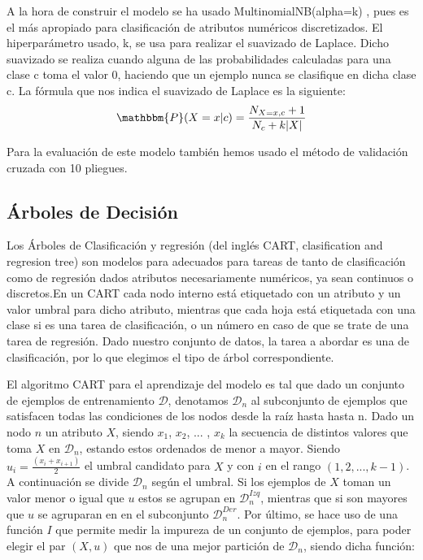 \documentclass[conference,a4paper]{IEEEtran}
\begin{document}
A la hora de construir el modelo se ha usado MultinomialNB(alpha=k)  \cite{b4}, pues es el más apropiado para clasificación de atributos numéricos discretizados. El hiperparámetro usado, k, se usa para realizar el suavizado de Laplace. Dicho suavizado se realiza cuando alguna de las probabilidades calculadas para una clase c toma el valor 0, haciendo que un ejemplo nunca se clasifique en dicha clase c. La fórmula que nos indica el suavizado de Laplace es la siguiente:
\begin{equation}
\mathbbm{P}(X = x | c) = \frac{N_{X=x,c}+1}{N_{c} + k|X|}
\end{equation}

Para la evaluación de este modelo también hemos usado el método de validación cruzada con 10 pliegues.

\subsection{Árboles de Decisión}

Los Árboles de Clasificación y regresión (del inglés CART, clasification and regresion tree) son modelos para adecuados para tareas de tanto de clasificación como de regresión dados atributos necesariamente numéricos, ya sean continuos o discretos.En un CART cada nodo interno está etiquetado con un atributo y un valor umbral para dicho atributo, mientras que cada hoja está etiquetada con una clase si es una tarea de clasificación, o un número en caso de que se trate de una tarea de regresión.  Dado nuestro conjunto de datos, la tarea a abordar es una de clasificación, por lo que elegimos el tipo de árbol correspondiente.

El algoritmo CART para el aprendizaje del modelo es tal que dado un conjunto de ejemplos de entrenamiento $\mathscr{D}$, denotamos  $\mathscr{D}_n$ al subconjunto de ejemplos que satisfacen  todas las condiciones de los nodos desde la raíz hasta hasta n. Dado un nodo $n$ un atributo $X$, siendo $x_1$, $x_2$, ... , $x_k$  la secuencia de distintos valores que toma $X$ en $\mathscr{D}_n$, estando estos ordenados de menor a mayor. Siendo $u_i = \frac{(x_i + x_{i+1})}{2} $ el umbral candidato para $X$ y con $i$ en el rango $(1, 2, ..., k-1)$. A continuación se divide  $\mathscr{D}_n$ según el umbral. Si los ejemplos de $X$ toman un valor menor o igual que $u$ estos se agrupan en  $\mathscr{D}_n^{Izq}$, mientras que si son mayores que $u$ se agruparan en en el subconjunto $\mathscr{D}_n^{Der}$. Por último, se hace uso de una función $I$ que permite medir la impureza de un conjunto de ejemplos, para poder elegir el par $(X, u)$ que nos de una mejor partición de  $\mathscr{D}_n$, siendo dicha función:
\end{document}
